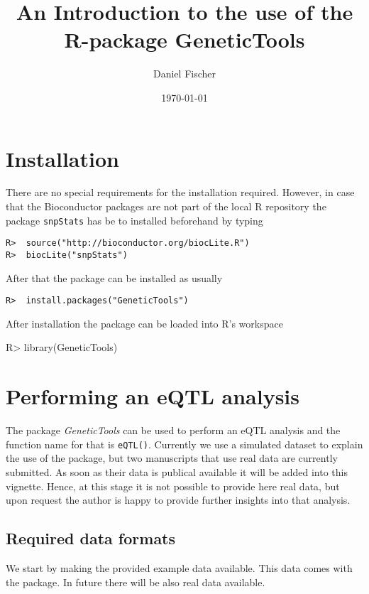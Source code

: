 \documentclass[a4paper,10pt]{article}
\title{An Introduction to the use of the R-package GeneticTools}
\author{Daniel Fischer}
\date{\today}
\begin{document}
\maketitle

\section{Installation}
There are no special requirements for the installation required. However, in case that the Bioconductor packages are not part of the local R repository the
package \texttt{snpStats} has be to installed beforehand by typing

\begin{verbatim}
R>  source("http://bioconductor.org/biocLite.R")
R>  biocLite("snpStats")
\end{verbatim}

After that the package can be installed as usually

\begin{verbatim}
R>  install.packages("GeneticTools")
\end{verbatim}

After installation the package can be loaded into R's workspace 

\begin{Schunk}
\begin{Sinput}
R>  library(GeneticTools)
\end{Sinput}
\end{Schunk}

\section{Performing an eQTL analysis}
The package \textit{GeneticTools} can be used to perform an eQTL analysis and the function name for that is \texttt{eQTL()}.
Currently we use a simulated dataset to explain the use of the package, but two manuscripts that use real data are currently submitted.
As soon as their data is publical available it will be added into this vignette. Hence, at this stage it is not possible to provide here
real data, but upon request the author is happy to provide further insights into that analysis.


\subsection{Required data formats}
We start by making the provided example data available. 
This data comes with the package. In future there will be also real data available.
\end{document}
